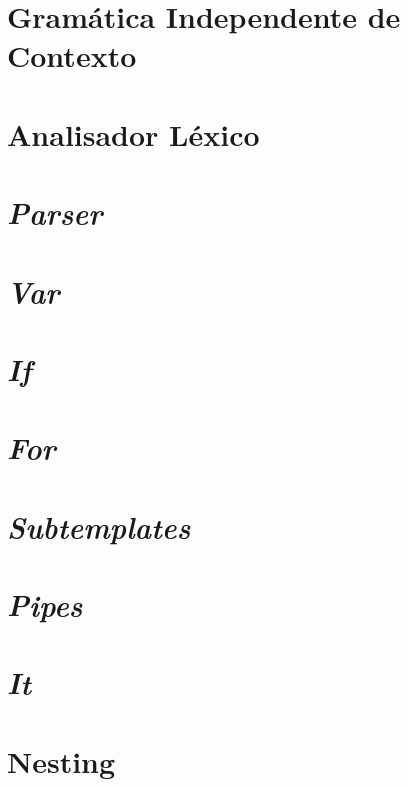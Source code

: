\documentclass[11pt]{report}
\begin{document}
\section{Gramática Independente de Contexto} \label{subsec:grammar}

\section{Analisador Léxico} \label{subsec:lex}

\section{\textit{Parser}} \label{subsec:strat}


\section{\textit{Var}} \label{subsec:var}


\section{\textit{If}} \label{subsec:If}


\section{\textit{For}}\label{subsec:For}


\section{\textit{Subtemplates}} \label{subsec:subt}


\section{\textit{Pipes}} \label{subsec:pipes}


\section{\textit{It}}\label{subsec:it}


\section{Nesting}
 \label{subsec:nest}
\end{document}
